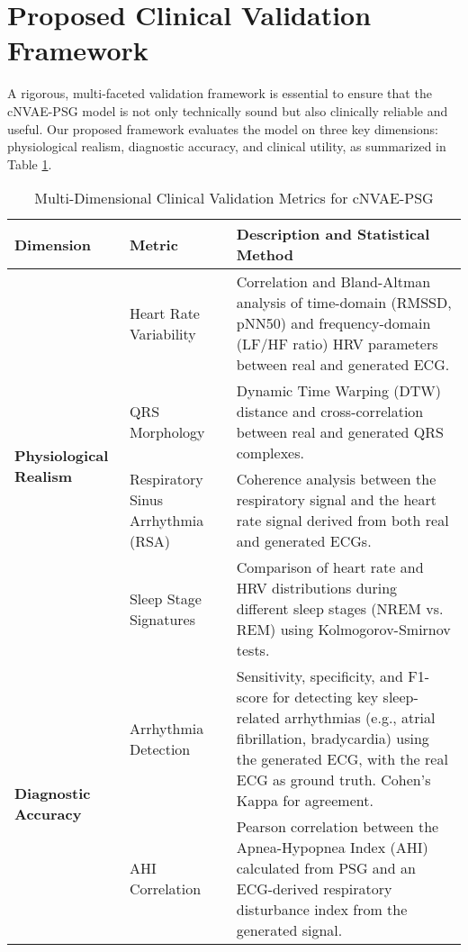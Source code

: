 \documentclass[10pt, conference]{IEEEtran}
\begin{document}
\section{Proposed Clinical Validation Framework}

A rigorous, multi-faceted validation framework is essential to ensure that the cNVAE-PSG model is not only technically sound but also clinically reliable and useful. Our proposed framework evaluates the model on three key dimensions: physiological realism, diagnostic accuracy, and clinical utility, as summarized in Table \ref{tab:validation_metrics}.

\begin{table}[H]
    \centering
    \caption{Multi-Dimensional Clinical Validation Metrics for cNVAE-PSG}
    \label{tab:validation_metrics}
    \begin{tabular}{p{} p{} p{}}
        \toprule
        \textbf{Dimension} & \textbf{Metric} & \textbf{Description and Statistical Method} \\
        \midrule
        \multirow{4}{*}{\textbf{Physiological Realism}} 
        & Heart Rate Variability & Correlation and Bland-Altman analysis of time-domain (RMSSD, pNN50) and frequency-domain (LF/HF ratio) HRV parameters between real and generated ECG. \\
        \cline{2-3}
        & QRS Morphology & Dynamic Time Warping (DTW) distance and cross-correlation between real and generated QRS complexes. \\
        \cline{2-3}
        & Respiratory Sinus Arrhythmia (RSA) & Coherence analysis between the respiratory signal and the heart rate signal derived from both real and generated ECGs. \\
        \cline{2-3}
        & Sleep Stage Signatures & Comparison of heart rate and HRV distributions during different sleep stages (NREM vs. REM) using Kolmogorov-Smirnov tests. \\
        \midrule
        \multirow{3}{*}{\textbf{Diagnostic Accuracy}}
        & Arrhythmia Detection & Sensitivity, specificity, and F1-score for detecting key sleep-related arrhythmias (e.g., atrial fibrillation, bradycardia) using the generated ECG, with the real ECG as ground truth. Cohen's Kappa for agreement. \\
        \cline{2-3}
        & AHI Correlation & Pearson correlation between the Apnea-Hypopnea Index (AHI) calculated from PSG and an ECG-derived respiratory disturbance index from the generated signal. \\

\end{tabular}
\end{table}
\end{document}
